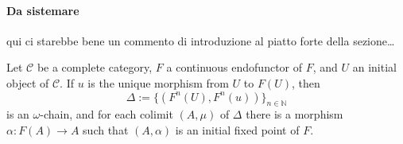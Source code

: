 \paragraph{Da sistemare} qui ci starebbe bene un commento di introduzione al piatto forte della sezione\dots

\begin{thm}
  Let \(\mathcal{C}\) be a complete category, \(F\) a continuous endofunctor of \(F\), and \(U\) an initial object of \(\mathcal{C}\). If \(u\) is the unique morphism from \(U\) to \(F(U)\), then
  \begin{equation}
    \Delta := \lbrace (F^n(U),F^n(u)) \rbrace_{n \in \mathbb{N}}
  \end{equation}
  is an \(\omega\)-chain, and for each colimit \((A,\mu)\) of \(\Delta\) there is a morphism \(\alpha \colon F(A) \to A\) such that \((A,\alpha)\) is an initial fixed point of \(F\).
\end{thm}
